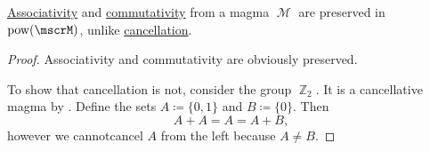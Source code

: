 \begin{proposition}\label{thm:power_set_magma_preservation}
  \hyperref[def:magma/associative]{Associativity} and \hyperref[def:magma/commutative]{commutativity} from a magma \( \mscrM \) are preserved in \( \pow(\mscrM) \), unlike \hyperref[def:magma/cancellative]{cancellation}.
\end{proposition}
\begin{proof}
  Associativity and commutativity are obviously preserved.

  To show that cancellation is not, consider the group \hyperref[def:group_of_integers_modulo]{\( \BbbZ_2 \)}. It is a cancellative magma by . Define the sets \( A \coloneqq \{ 0, 1 \} \) and \( B \coloneqq \{ 0 \} \). Then
  \begin{equation*}
    A + A = A = A + B,
  \end{equation*}
  however we cannot\DNE cancel \( A \) from the left because \( A \neq B \).
\end{proof}

